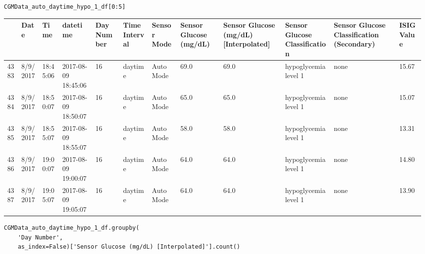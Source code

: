 \bigskip

\begin{verbatim}
CGMData_auto_daytime_hypo_1_df[0:5]
\end{verbatim}

\bigskip\noindent
\begin{tabular}{p{}p{}p{}p{}p{}p{}p{}p{}p{}p{}p{}p{}}
\toprule
 & Date & Time & datetime & Day Number & Time Interval & Sensor Mode & Sensor Glucose (mg/dL) & Sensor Glucose (mg/dL) [Interpolated] & Sensor Glucose Classification & Sensor Glucose Classification (Secondary) & ISIG Value \\
\hline
4383 & 8/9/2017 & 18:45:06 & 2017-08-09 18:45:06 & 16 & daytime & Auto Mode & 69.0 & 69.0 & hypoglycemia level 1 & none & 15.67 \\
\hline
4384 & 8/9/2017 & 18:50:07 & 2017-08-09 18:50:07 & 16 & daytime & Auto Mode & 65.0 & 65.0 & hypoglycemia level 1 & none & 15.07 \\
\hline
4385 & 8/9/2017 & 18:55:07 & 2017-08-09 18:55:07 & 16 & daytime & Auto Mode & 58.0 & 58.0 & hypoglycemia level 1 & none & 13.31 \\
\hline
4386 & 8/9/2017 & 19:00:07 & 2017-08-09 19:00:07 & 16 & daytime & Auto Mode & 64.0 & 64.0 & hypoglycemia level 1 & none & 14.80 \\
\hline
4387 & 8/9/2017 & 19:05:07 & 2017-08-09 19:05:07 & 16 & daytime & Auto Mode & 64.0 & 64.0 & hypoglycemia level 1 & none & 13.90 \\
\hline
\bottomrule
\end{tabular}

\bigskip

\begin{verbatim}
CGMData_auto_daytime_hypo_1_df.groupby(
    'Day Number',
    as_index=False)['Sensor Glucose (mg/dL) [Interpolated]'].count()
\end{verbatim}

